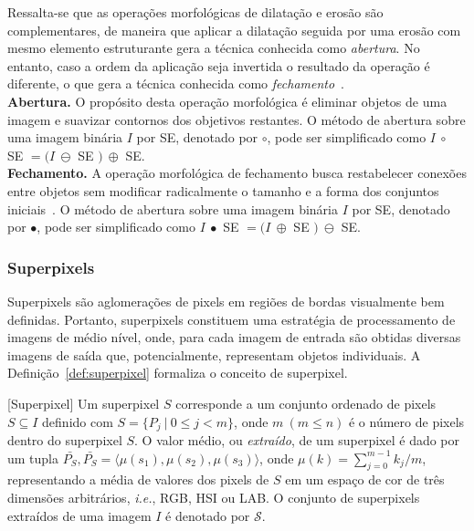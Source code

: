Ressalta-se que as operações morfológicas de dilatação e erosão são complementares, de maneira que aplicar a dilatação seguida por uma erosão com mesmo elemento estruturante gera a técnica conhecida como \textit{abertura}.
No entanto, caso a ordem da aplicação seja invertida o resultado da operação é diferente, o que gera a técnica conhecida como \textit{fechamento}~\cite{Sonka1993}.\\

\noindent
\textbf{Abertura.} 
O propósito desta operação morfológica é eliminar objetos de uma imagem e suavizar contornos dos objetivos restantes.
O método de abertura sobre uma imagem binária $I$ por SE, denotado por $\circ$, pode ser simplificado como
$I~\circ$ SE $ = (I~\ominus $ SE $)~\oplus$ SE.\\

\noindent
\textbf{Fechamento.}
A operação morfológica de fechamento busca restabelecer conexões entre objetos sem modificar radicalmente o tamanho e a forma dos conjuntos iniciais~\cite{Gil2002}.
O método de abertura sobre uma imagem binária $I$ por SE, denotado por $\bullet$, pode ser simplificado como
$I~\bullet$ SE $ = (I~\oplus $ SE $)~\ominus$ SE.

\subsubsection{Superpixels}

Superpixels são aglomerações de pixels em regiões de bordas visualmente bem definidas.
Portanto, superpixels constituem uma estratégia de processamento de imagens de médio nível, onde, para cada imagem de entrada são obtidas diversas imagens de saída que, potencialmente, representam objetos individuais.
A Definição~\ref{def:superpixel} formaliza o conceito de superpixel.

\begin{definition}\label{def:superpixel}[Superpixel]
Um superpixel $S$ corresponde a um conjunto ordenado de pixels $S \subseteq I$ definido com $S = \{P_{j} ~|~ 0 \leq j < m \}$, onde $m ~(m \leq n)$ é o número de pixels dentro do superpixel $S$. 
O valor médio, ou \textit{extraído}, de um superpixel é dado por um tupla $\bar{P_S}, \bar{P_S} = \langle \mu(s_1), \mu(s_2), \mu(s_3)\rangle$, onde $\mu(k) = \sum_{j = 0}^{m-1} k_j/m$, representando a média de valores dos pixels de $S$ em um espaço de cor de três dimensões arbitrários, \textit{i.e.}, RGB, HSI ou LAB.
O conjunto de superpixels extraídos de uma imagem $I$ é denotado por $\mathcal{S}$.
\end{definition}

